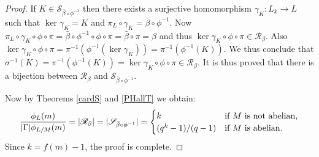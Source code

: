 \begin{proof}
    If $K \in \mathscr{S}_{\bar{\beta} \circ \phi^{-1}}$ then there exists a surjective homomorphism $\gamma_K \colon L_k \rightarrow L$ such that $\ker \gamma_K = K$ and $\pi_L \circ \gamma_K = \bar{\beta} \circ \phi^{-1}$. 
    Now $ \pi_L \circ \gamma_K \circ \phi \circ \pi = \bar{\beta} \circ \phi^{-1} \circ \phi \circ \pi = \bar{\beta} \circ \pi = \beta$ and thus $\ker{\gamma_K \circ \phi \circ \pi} \in \mathscr{R}_\beta$. Also $\ker{\gamma_K \circ \phi \circ \pi} = \pi^{-1}(\phi^{-1}(\ker \gamma_K)) = \pi^{-1}(\phi^{-1}(K))$.
    We thus conclude that $\sigma^{-1}(K) = \pi^{-1}(\phi^{-1}(K)) = \ker{\gamma_K \circ \phi \circ \pi} \in \mathscr{R}_\beta$. It is thus proved that there is a bijection between $\mathscr{R}_\beta$ and $\mathscr{S}_{\bar{\beta} \circ \phi^{-1}}$.
    
    Now by Theorems \ref{cardS} and \ref{PHallT} we obtain:
    $$
    \frac{\phi_L(m)}{| \Gamma |\phi_{L/M}(m)} = | \mathscr{R}_\beta | = | \mathscr{S}_{\bar{\beta} \circ \phi^{-1}} | = 
    \begin{cases}
        k & \text{if } M \text{ is not abelian,} \\
        (q^k-1)/(q-1) & \text{if } M \text{ is abelian.} \\
    \end{cases}
    $$
    Since $k = f(m)-1$, the proof is complete.    
\end{proof}